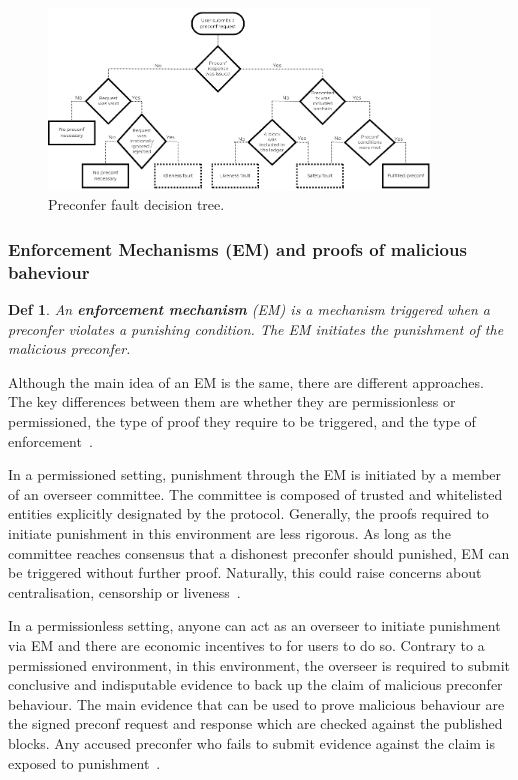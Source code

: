 \documentclass[a4paper]{article}
\theoremstyle{boldstyle}
\newtheorem*{definitionx}{Def}
\newenvironment{definition}
  {\begin{defopenboxq}\begin{definitionx}}
  {\end{definitionx}\end{defopenboxq}}
\begin{document}
    \begin{figure}[htbp]
        \centering
        \includegraphics[width=0.9\textwidth]{figures/preconferFaultDecisionTree.png}
        \caption{Preconfer fault decision tree.}
        \label{preconfer fault tree}
    \end{figure}
    

\subsubsection{Enforcement Mechanisms (EM) and proofs of malicious baheviour} 

    \begin{definition}
        An \textbf{enforcement mechanism} (EM) is a mechanism 
        triggered when a preconfer violates a punishing condition. The EM initiates the punishment of the malicious preconfer.
    \end{definition}

    Although the main idea of an EM is the same, there are different approaches. The key differences between them are whether they are permissionless or permissioned, the type of proof they require to be triggered, and the type of enforcement~\cite{W:PreconfirmationFairExchange}.

    In a permissioned setting, punishment through the EM is initiated by a member of an overseer committee. The committee is composed of trusted and whitelisted entities explicitly designated by the protocol. Generally, the proofs required to initiate punishment in this environment are less rigorous.  As long as the committee reaches consensus that a dishonest preconfer should punished, EM can be triggered without further proof. Naturally, this could raise concerns about centralisation, censorship or liveness~\cite{W:PreconfirmationFairExchange}.

    In a permissionless setting, anyone can act as an overseer to initiate punishment via EM and there are economic incentives to for users to do so. Contrary to a permissioned environment, in this environment, the overseer is required to submit conclusive and indisputable evidence to back up the claim of malicious preconfer behaviour. The main evidence that can be used to prove malicious behaviour are the signed preconf request and response which are checked against the published blocks. Any accused preconfer who fails to submit evidence against the claim is exposed to punishment~\cite{W:GitHub-UniversalRegistryContract,W:GitHub-ExampleSlasherImplementations,W:PreconfirmationFairExchange}.
\end{document}
